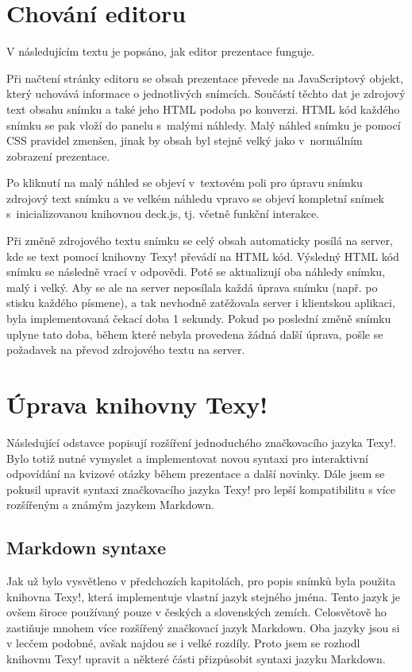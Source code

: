 \documentclass[11pt,twoside,a4paper]{book}
\begin{document}
\section{Chování editoru}
V následujícím textu je popsáno, jak editor prezentace funguje.

Při načtení stránky editoru se obsah prezentace převede na JavaScriptový objekt, který uchovává informace o jednotlivých snímcích. Součástí těchto dat je zdrojový text obsahu snímku a také jeho HTML podoba po konverzi. HTML kód každého snímku se pak vloží do panelu s~malými náhledy. Malý náhled snímku je pomocí CSS pravidel zmenšen, jinak by obsah byl stejně velký jako v~normálním zobrazení prezentace.

Po kliknutí na malý náhled se objeví v~textovém poli pro úpravu snímku zdrojový text snímku a ve velkém náhledu vpravo se objeví kompletní snímek s~inicializovanou knihovnou deck.js, tj. včetně funkční interakce.

Při změně zdrojového textu snímku se celý obsah automaticky posílá na server, kde se text pomocí knihovny Texy! převádí na HTML kód. Výsledný HTML kód snímku se následně vrací v odpovědi. Poté se aktualizují oba náhledy snímku, malý i velký. Aby se ale na server neposílala každá úprava snímku (např. po stisku každého písmene), a tak nevhodně zatěžovala server i klientskou aplikaci, byla implementovaná čekací doba 1 sekundy. Pokud po poslední změně snímku uplyne tato doba, během které nebyla provedena žádná další úprava, pošle se požadavek na převod zdrojového textu na server.


\section{Úprava knihovny Texy!}
Následující odstavce popisují rozšíření jednoduchého značkovacího jazyka Texy!. Bylo totiž nutné vymyslet a implementovat novou syntaxi pro interaktivní odpovídání na kvizové otázky během prezentace a další novinky. Dále jsem se pokusil upravit syntaxi značkovacího jazyka Texy! pro lepší kompatibilitu s více rozšířeným a známým jazykem Markdown.

\subsection{Markdown syntaxe}
Jak už bylo vysvětleno v předchozích kapitolách, pro popis snímků byla použita knihovna Texy!, která implementuje vlastní jazyk stejného jména. Tento jazyk je ovšem široce používaný pouze v českých a slovenských zemích. Celosvětově ho zastiňuje mnohem více rozšířený značkovací jazyk Markdown. Oba jazyky jsou si v lecčem podobné, avšak najdou se i velké rozdíly. Proto jsem se rozhodl knihovnu Texy! upravit a některé části přizpůsobit syntaxi jazyku Markdown.
\end{document}
